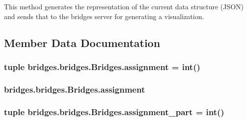 This method generates the representation of the current data structure (J\+S\+O\+N) and sends that to the bridges server for generating a visualization. 



\subsection{Member Data Documentation}
\hypertarget{classbridges_1_1bridges_1_1_bridges_a1a89d732324054f1f349547373c9605c}{}
\subsubsection[{assignment}]{\setlength{\rightskip}{0pt plus 5cm}tuple bridges.\+bridges.\+Bridges.\+assignment = int()\hspace{0.3cm}{\ttfamily [static]}}\label{classbridges_1_1bridges_1_1_bridges_a1a89d732324054f1f349547373c9605c}
\hypertarget{classbridges_1_1bridges_1_1_bridges_a2752e73a21f14efb9382217fcd431960}{}
\subsubsection[{assignment}]{\setlength{\rightskip}{0pt plus 5cm}bridges.\+bridges.\+Bridges.\+assignment}\label{classbridges_1_1bridges_1_1_bridges_a2752e73a21f14efb9382217fcd431960}
\hypertarget{classbridges_1_1bridges_1_1_bridges_a7b944613be7669203fd1312bfa1bca05}{}
\subsubsection[{assignment\+\_\+part}]{\setlength{\rightskip}{0pt plus 5cm}tuple bridges.\+bridges.\+Bridges.\+assignment\+\_\+part = int()\hspace{0.3cm}{\ttfamily [static]}}\label{classbridges_1_1bridges_1_1_bridges_a7b944613be7669203fd1312bfa1bca05}
\hypertarget{classbridges_1_1bridges_1_1_bridges_a6fb18c021f26c0109c9b416c976f0903}{}
